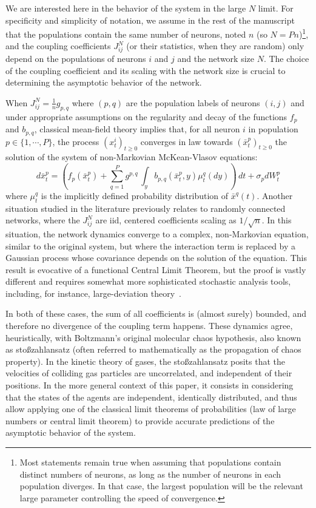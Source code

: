 \documentclass[onefignum,onetabnum]{siamart190516}
\newcommand{\1}{\mathbbm{1}}
\newcommand{\review}[1]{\textcolor{midblue}{ #1}}
\renewcommand{\review}[1]{{ #1}}
\begin{document}
\review{We are interested here in the behavior of the system in the large $N$ limit. For specificity and simplicity of notation, we assume in the rest of the manuscript that the populations contain the same number of neurons, noted $n$ (so $N=Pn$)\footnote{Most statements remain true when assuming that populations contain distinct numbers of neurons, as long as the number of neurons in each population diverges. In that case, the largest population will be the relevant large parameter controlling the speed of convergence.}, and the coupling coefficients $J_{ij}^N$ (or their statistics, when they are random) only depend on the populations of neurons $i$ and $j$ and the network size $N$. The choice of the coupling coefficient and its scaling with the network size is crucial to determining the asymptotic behavior of the network.}

\review{When $J_{ij}^N=\frac 1 n g_{p,q}$ where $(p,q)$ are the population labels of neurons $(i,j)$ and under} appropriate assumptions on the regularity and decay of the functions $f_p$ and $b_{p,q}$, classical mean-field theory implies that, for all neuron $i$ in population $p\in \{1,\cdots,P\}$, the process $(x^i_t)_{t\geq 0}$ converges in law towards $(\bar{x}^p_t)_{t\geq 0}$ the solution of the system of non-Markovian McKean-Vlasov equations:
\begin{equation}\label{eq:nonlinear_process}
d\bar{x}_t^{p} = \left(f_p(\bar x_t^p) + \sum_{q=1}^P g^{p,q}\,\int_{y} b_{p,q}(\bar x_t^p,y)\mu_t^q(dy) \right)\,dt+ \sigma_p dW^p_t
\end{equation}
where $\mu_t^q$ is the implicitly defined probability distribution of $\bar{x}^q(t)$. 
\review{Another situation studied in the literature previously relates to randomly connected networks, where the $J_{ij}^{N}$ are iid, centered coefficients scaling as $1/\sqrt{n}$. In this situation, the network dynamics converge to a complex, non-Markovian equation, similar to the original system, but where the interaction term is replaced by a Gaussian process whose covariance depends on the solution of the equation. This result is evocative of a functional Central Limit Theorem, but the proof is vastly different and requires somewhat more sophisticated stochastic analysis tools, including, for instance, large-deviation theory~\cite{sompolinsky1988chaos,arous1995large,arous1997symmetric,cabana1,cabana2}.}

\review{In both of these cases, the sum of all coefficients is (almost surely) bounded, and therefore no divergence of the coupling term happens. These dynamics agree, heuristically, with Boltzmann's original molecular chaos hypothesis, also known as sto\ss zahlansatz (often referred to mathematically as the propagation of chaos property). In the kinetic theory of gases, the sto\ss zahlansatz posits that the velocities of colliding gas particles are uncorrelated, and independent of their positions. In the more general context of this paper, it consists in considering that the states of the agents are independent, identically distributed, and thus allow applying one of the classical limit theorems of probabilities (law of large numbers or central limit theorem) to provide accurate predictions of the asymptotic behavior of the system.}
\end{document}
